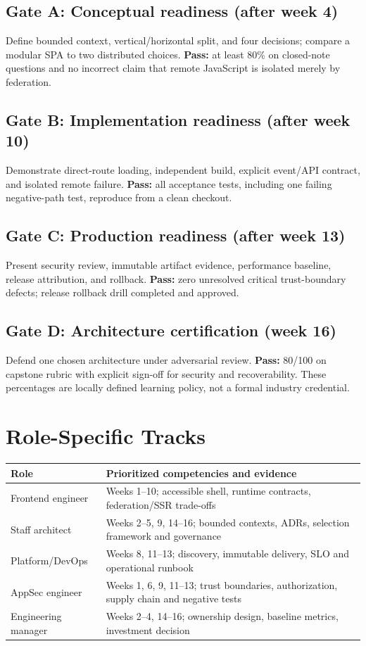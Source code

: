 \documentclass[11pt,letterpaper,oneside]{report}
\begin{document}
\section{Gate A: Conceptual readiness (after week 4)}
Define bounded context, vertical/horizontal split, and four decisions; compare a modular SPA to two distributed choices. \textbf{Pass:} at least 80\% on closed-note questions and no incorrect claim that remote JavaScript is isolated merely by federation.
\section{Gate B: Implementation readiness (after week 10)}
Demonstrate direct-route loading, independent build, explicit event/API contract, and isolated remote failure. \textbf{Pass:} all acceptance tests, including one failing negative-path test, reproduce from a clean checkout.
\section{Gate C: Production readiness (after week 13)}
Present security review, immutable artifact evidence, performance baseline, release attribution, and rollback. \textbf{Pass:} zero unresolved critical trust-boundary defects; release rollback drill completed and approved.
\section{Gate D: Architecture certification (week 16)}
Defend one chosen architecture under adversarial review. \textbf{Pass:} 80/100 on capstone rubric with explicit sign-off for security and recoverability. These percentages are locally defined learning policy, not a formal industry credential.
\chapter{Role-Specific Tracks}
\begin{tabularx}{\linewidth}{>{\raggedright\arraybackslash}p{.22\linewidth}>{\raggedright\arraybackslash}X}\toprule Role & Prioritized competencies and evidence \\\midrule
Frontend engineer & Weeks 1--10; accessible shell, runtime contracts, federation/SSR trade-offs\\
Staff architect & Weeks 2--5, 9, 14--16; bounded contexts, ADRs, selection framework and governance\\
Platform/DevOps & Weeks 8, 11--13; discovery, immutable delivery, SLO and operational runbook\\
AppSec engineer & Weeks 1, 6, 9, 11--13; trust boundaries, authorization, supply chain and negative tests\\
Engineering manager & Weeks 2--4, 14--16; ownership design, baseline metrics, investment decision\\\bottomrule\end{tabularx}
\end{document}
